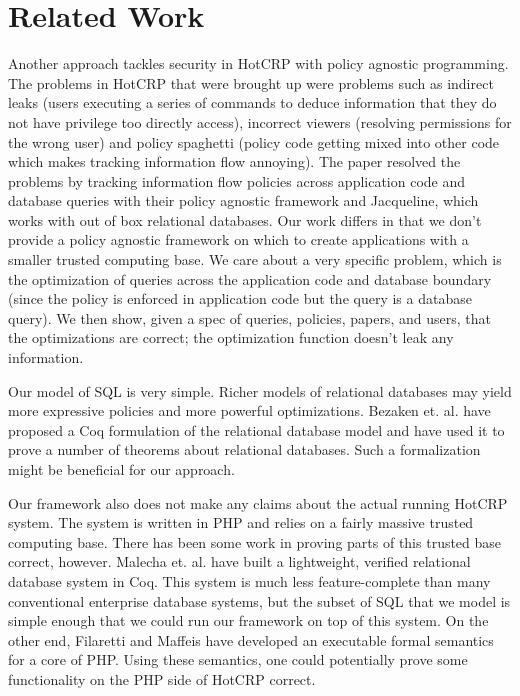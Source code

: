 \documentclass[11pt,journal]{IEEEtran}
\begin{document}
\section{Related Work}
\label{sec:related}
Another approach tackles security in HotCRP with policy agnostic programming\cite{yang}. The problems in HotCRP that were brought up were problems such as indirect leaks (users executing a series of commands to deduce information that they do not have privilege too directly access), incorrect viewers (resolving permissions for the wrong user) and policy spaghetti (policy code getting mixed into other code which makes tracking information flow annoying). The paper resolved the problems by tracking information flow policies across application code and database queries with their policy agnostic framework and Jacqueline, which works with out of box relational databases. Our work differs in that we don't provide a policy agnostic framework on which to create applications with a smaller trusted computing base. We care about a very specific problem, which is the optimization of queries across the application code and database boundary (since the policy is enforced in application code but the query is a database query). We then show, given a spec of queries, policies, papers, and users, that the optimizations are correct; the optimization function doesn't leak any information. 

Our model of SQL is very simple.  Richer models of relational databases may yield more expressive policies and more powerful optimizations.  Bezaken et. al. have proposed a Coq formulation of the relational database model and have used it to prove a number of theorems about relational databases.  Such a formalization might be beneficial for our approach.

Our framework also does not make any claims about the actual running HotCRP system.  The system is written in PHP and relies on a fairly massive trusted computing base.  There has been some work in proving parts of this trusted base correct, however.  Malecha et. al. have built a lightweight, verified relational database system in Coq\cite{malecha}.  This system is much less feature-complete than many conventional enterprise database systems, but the subset of SQL that we model is simple enough that we could run our framework on top of this system.  On the other end, Filaretti and Maffeis have developed an executable formal semantics for a core of PHP.  Using these semantics, one could potentially prove some functionality on the PHP side of HotCRP correct.
\end{document}
